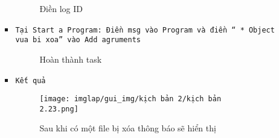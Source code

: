 \documentclass[13pt]{article}
\begin{document}
\begin{enumerate}
\begin{itemize}
\begin{itemize}
\begin{figure}[H]
 		\hfill
 				\caption{Điền log ID}
 				\label{fig:AD_p2}
 		\end{figure}
\newpage
        \item \texttt{Tại Start a Program: Điền msg vào Program và điền “ * Object vua bi xoa” vào Add agruments}
        \begin{figure}[H]
 		\hfill
 		\hfill
 				\caption{Hoàn thành task}
 				\label{fig:AD_p2}
 		\end{figure}
        \item \texttt{Kết quả}
        \begin{figure}[H]
            \centering
            \texttt{[image: imglap/gui\_img/kịch bản 2/kịch bản 2.23.png]}
            \caption{Sau khi có một file bị xóa thông báo sẽ hiển thị}
            \label{fig:enter-label}
        \end{figure}
                \end{itemize}
                \end{itemize}
        \end{enumerate}

        \newpage
\end{document}
